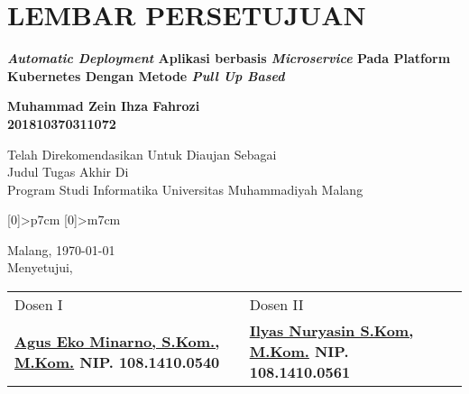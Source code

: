 %

\doublespacing
\chapter*{\uppercase{LEMBAR PERSETUJUAN}}
\onehalfspacing
\begin{center}
	\large \bfseries \textit{Automatic Deployment}  Aplikasi berbasis \textit{Microservice} Pada Platform Kubernetes Dengan Metode \textit{Pull Up Based} \\

	\vspace{2.5cm}

	\bfseries{Muhammad Zein Ihza Fahrozi\\
		201810370311072}

	\vspace{1cm}
	\normalfont\normalsize Telah Direkomendasikan Untuk Diaujan Sebagai\\
	Judul Tugas Akhir Di\\
	Program Studi Informatika Universitas Muhammadiyah Malang
\end{center}

\vspace{5cm}



\newcolumntype{P}[0]{>{\centering\arraybackslash}p{7cm}}
\newcolumntype{M}[0]{>{\centering\arraybackslash}m{7cm}}

\begin{center}
	\normalfont\normalsize Malang, \today \\
	Menyetujui,
\end{center}

\begin{table}[!ht]
	\centering
	\begin{tabular}{MM}

		Dosen I                                                                                             & Dosen II                                                                                        \\
		\rule{0pt}{4cm} \bfseries{\underline{Agus Eko Minarno, S.Kom., M.Kom.}} \newline NIP. 108.1410.0540 & \rule{0pt}{4cm} \bfseries{\underline{Ilyas Nuryasin S.Kom, M.Kom.}} \newline NIP. 108.1410.0561 \\
	\end{tabular}
\end{table}

\newpage
\onehalfspacing